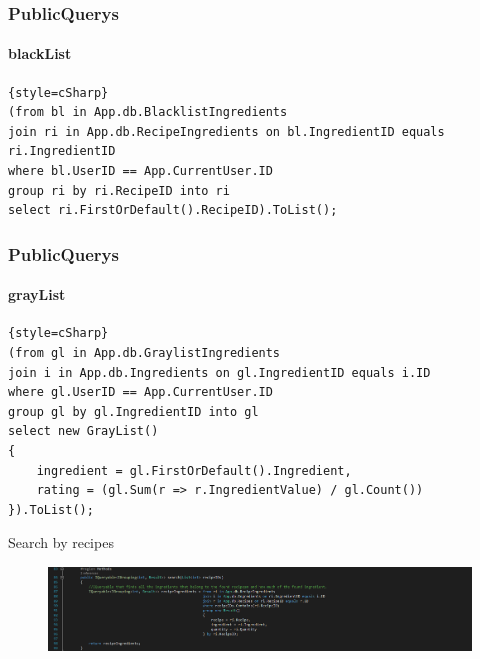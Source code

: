 \begin{frame}[fragile]
\frametitle{PublicQuerys}
\framesubtitle{blackList}
\fontsize{8pt}{7}\selectfont
\begin{lstlisting}{style=cSharp}
(from bl in App.db.BlacklistIngredients
join ri in App.db.RecipeIngredients on bl.IngredientID equals ri.IngredientID
where bl.UserID == App.CurrentUser.ID
group ri by ri.RecipeID into ri
select ri.FirstOrDefault().RecipeID).ToList();
\end{lstlisting}
\end{frame}

\begin{frame}[fragile]
\frametitle{PublicQuerys}
\framesubtitle{grayList}
\fontsize{8pt}{7}\selectfont
\begin{lstlisting}{style=cSharp}
(from gl in App.db.GraylistIngredients
join i in App.db.Ingredients on gl.IngredientID equals i.ID
where gl.UserID == App.CurrentUser.ID
group gl by gl.IngredientID into gl
select new GrayList()
{
    ingredient = gl.FirstOrDefault().Ingredient,
    rating = (gl.Sum(r => r.IngredientValue) / gl.Count())
}).ToList();
\end{lstlisting}
\end{frame}







\begin{frame}{Search by recipes}
    \begin{figure}
        \centering
        \includegraphics[width=\textwidth]{Grafik/search}
    \end{figure}
\end{frame}

